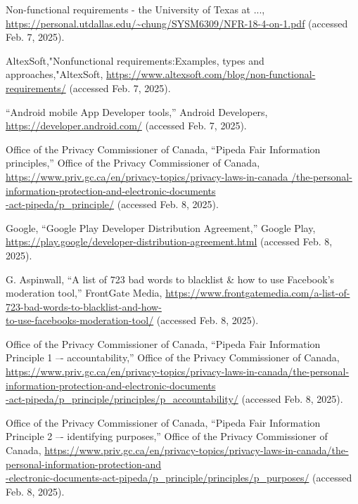 \documentclass[]{article}
\begin{document}
\label{sub:references}
\begin{thebibliography}{99}
     Non-functional requirements - the University of Texas at ..., 
    \url{https://personal.utdallas.edu/~chung/SYSM6309/NFR-18-4-on-1.pdf} 
    (accessed Feb. 7, 2025).
    
     AltexSoft,"Nonfunctional requirements:Examples, types and approaches,"AltexSoft, 
    \url{https://www.altexsoft.com/blog/non-functional-requirements/} 
    (accessed Feb. 7, 2025).
    
     “Android mobile App Developer tools,” Android Developers, 
    \url{https://developer.android.com/} 
    (accessed Feb. 7, 2025). 
    
     Office of the Privacy Commissioner of Canada, “Pipeda Fair Information principles,” Office of the Privacy Commissioner of Canada,  \url{https://www.priv.gc.ca/en/privacy-topics/privacy-laws-in-canada /the-personal-information-protection-and-electronic-documents}\\
    \url{-act-pipeda/p_principle/} 
    (accessed Feb. 8, 2025). 
    
      Google, “Google Play Developer Distribution Agreement,” Google Play,  
    \url{https://play.google/developer-distribution-agreement.html} 
    (accessed Feb. 8, 2025). 
    
     G. Aspinwall, “A list of 723 bad words to blacklist \& how to use Facebook’s moderation tool,” FrontGate Media,  
    \url{https://www.frontgatemedia.com/a-list-of-723-bad-words-to-blacklist-and-how-}\\
    \url{to-use-facebooks-moderation-tool/}
    (accessed Feb. 8, 2025). 
    
     Office of the Privacy Commissioner of Canada, “Pipeda Fair Information Principle 1 –- accountability,” Office of the Privacy Commissioner of Canada,
    \url{https://www.priv.gc.ca/en/privacy-topics/privacy-laws-in-canada/the-personal-information-protection-and-electronic-documents}\\
    \url{-act-pipeda/p_principle/principles/p_accountability/} 
    (accessed Feb. 8, 2025). 
   
     Office of the Privacy Commissioner of Canada, “Pipeda Fair Information Principle 2 –- identifying purposes,” Office of the Privacy Commissioner of Canada,  
    \url{https://www.priv.gc.ca/en/privacy-topics/privacy-laws-in-canada/the-personal-information-protection-and}\\
    \url{-electronic-documents-act-pipeda/p_principle/principles/p_purposes/} 
    (accessed Feb. 8, 2025). 
   

\end{thebibliography}
\end{document}
